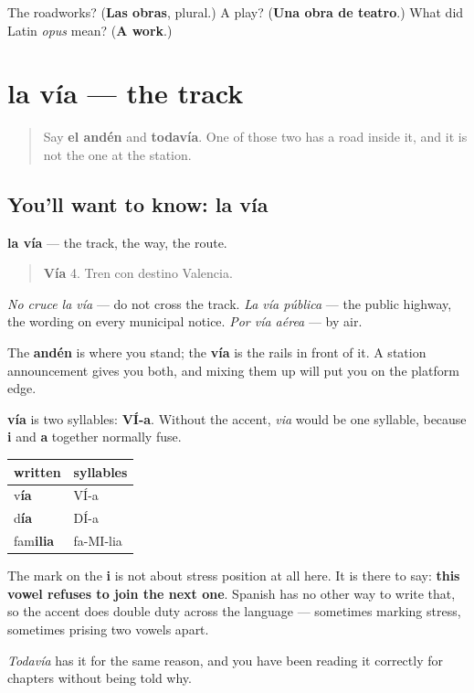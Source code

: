 \begin{tcolorbox}[breakable,colback=teal!4,colframe=teal!35!black,title={Before you move on}]
The roadworks? (\textbf{Las obras}, plural.) A play? (\textbf{Una obra de teatro}.) What did Latin \emph{opus} mean? (\textbf{A work}.)
\end{tcolorbox}
\section[la vía]{la vía — the track}

\label{lesson:ES-C454-via}



\begin{quote}
Say \textbf{el andén} and \textbf{todavía}. One of those two has a road inside it, and it is not the one at the station.
\end{quote}

\subsection*{You'll want to know: la vía}
\textbf{la vía} — the track, the way, the route.

\begin{quote}
\textbf{Vía} 4. Tren con destino Valencia.
\end{quote}

\emph{No cruce la vía} — do not cross the track. \emph{La vía pública} — the public highway, the wording on every municipal notice. \emph{Por vía aérea} — by air.

The \textbf{andén} is where you stand; the \textbf{vía} is the rails in front of it. A station announcement gives you both, and mixing them up will put you on the platform edge.

\begin{grammarlens}[title={Grammar Lens: the accent that breaks a diphthong}]
\textbf{vía} is two syllables: \textbf{VÍ-a}. Without the accent, \emph{via} would be one syllable, because \textbf{i} and \textbf{a} together normally fuse.

\noindent
\begin{tabularx}{\linewidth}{@{}>{\raggedright\arraybackslash}X>{\raggedright\arraybackslash}X@{}}
\toprule
\textbf{written} & \textbf{syllables} \\
\midrule
v\textbf{ía} & VÍ-a \\
d\textbf{ía} & DÍ-a \\
fam\textbf{ilia} & fa-MI-lia \\
\bottomrule
\end{tabularx}

The mark on the \textbf{i} is not about stress position at all here. It is there to say: \textbf{this vowel refuses to join the next one}. Spanish has no other way to write that, so the accent does double duty across the language — sometimes marking stress, sometimes prising two vowels apart.

\emph{Todavía} has it for the same reason, and you have been reading it correctly for chapters without being told why.
\end{grammarlens}

